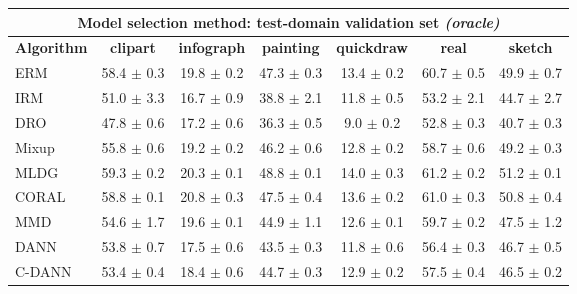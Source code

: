 \documentclass{article}
\begin{document}
\begin{center}
\begin{tabular}{lcccccc}
\toprule
\multicolumn{7}{c}{\textbf{Model selection method: test-domain validation set \textit{(oracle)}}} \\
\midrule
\textbf{Algorithm}    & \textbf{clipart} & \textbf{infograph} & \textbf{painting} & \textbf{quickdraw} & \textbf{real} & \textbf{sketch}     \\
\midrule
ERM               &         58.4 $\pm$ 0.3        &     19.8 $\pm$ 0.2     &        47.3 $\pm$ 0.3      &       13.4 $\pm$ 0.2      &       60.7 $\pm$ 0.5      &       49.9 $\pm$ 0.7 \\            
IRM               &         51.0 $\pm$ 3.3        &     16.7 $\pm$ 0.9     &        38.8 $\pm$ 2.1      &       11.8 $\pm$ 0.5      &       53.2 $\pm$ 2.1      &       44.7 $\pm$ 2.7 \\            
DRO         &         47.8 $\pm$ 0.6        &     17.2 $\pm$ 0.6     &        36.3 $\pm$ 0.5     &        9.0 $\pm$ 0.2      &        52.8 $\pm$ 0.3      &       40.7 $\pm$ 0.3 \\            
Mixup             &         55.8 $\pm$ 0.6        &     19.2 $\pm$ 0.2     &        46.2 $\pm$ 0.6      &       12.8 $\pm$ 0.2      &       58.7 $\pm$ 0.6      &       49.2 $\pm$ 0.3 \\            
MLDG              &         59.3 $\pm$ 0.2        &     20.3 $\pm$ 0.1     &        48.8 $\pm$ 0.1      &       14.0 $\pm$ 0.3      &       61.2 $\pm$ 0.2      &       51.2 $\pm$ 0.1 \\            
CORAL             &         58.8 $\pm$ 0.1        &     20.8 $\pm$ 0.3     &        47.5 $\pm$ 0.4      &       13.6 $\pm$ 0.2      &       61.0 $\pm$ 0.3      &       50.8 $\pm$ 0.4 \\            
MMD               &         54.6 $\pm$ 1.7        &     19.6 $\pm$ 0.1     &        44.9 $\pm$ 1.1      &       12.6 $\pm$ 0.1      &       59.7 $\pm$ 0.2      &       47.5 $\pm$ 1.2 \\            
DANN               &         53.8 $\pm$ 0.7        &     17.5 $\pm$ 0.6     &        43.5 $\pm$ 0.3      &       11.8 $\pm$ 0.6      &       56.4 $\pm$ 0.3      &       46.7 $\pm$ 0.5 \\            
C-DANN           &         53.4 $\pm$ 0.4        &     18.4 $\pm$ 0.6     &        44.7 $\pm$ 0.3      &       12.9 $\pm$ 0.2      &       57.5 $\pm$ 0.4      &       46.5 $\pm$ 0.2 \\            
\bottomrule
\end{tabular}
\end{center}
\end{document}
